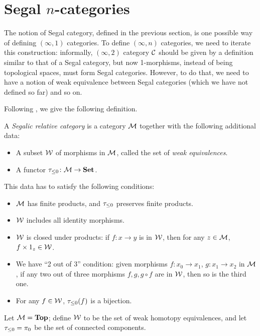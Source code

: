 \section{Segal $n$-categories}\label{s:segal-ncat}

The notion of Segal category, defined in the previous section, is one possible
way of defining $(\infty, 1)$ categories. To define $(\infty,n)$ categories, we
need to iterate this construction: informally, $(\infty, 2)$ category $\mathcal{C}$
should be given by a definition similar to that of a Segal category, but now
1-morphisms, instead of being topological spaces, must form Segal categories.
However, to do that, we need to have a notion of weak equivalence between Segal
categories (which we have not defined so far) and so on.


Following \cite{schommer-pries-category}, we give the following definition.

\begin{definition}
  A \emph{Segalic relative category} is a category $\mathcal{M}$ together with the
  following additional data:
  \begin{itemize}
    \item A subset $\mathcal{W}$ of morphisms in $\mathcal{M}$, called the set of
      \emph{weak equivalences}.
    \item A functor $\tau_{\leq 0}\colon \mathcal{M}\to \mathbf{Set}$.
  \end{itemize}
  This data has to satisfy the following conditions:
  \begin{itemize}
    \item $\mathcal{M}$ has finite products, and $\tau_{\leq 0}$ preserves finite
      products.
    \item $\mathcal{W}$ includes all identity morphisms.
    \item $\mathcal{W}$ is closed under products: if $f\colon x\to y$ is in $\mathcal{W}$,
      then for any $z\in \mathcal{M}$, $f\times 1_z\in \mathcal{W}$.
    \item We have ``2 out of 3'' condition: given morphisms $f\colon x_0\to
      x_1$, $g\colon x_1\to x_2$ in $\mathcal{M}$, if any two out of three morphisms
      $f, g, g\circ f$ are in $\mathcal{W}$, then so is the third one.
    \item For any $f\in \mathcal{W}$, $\tau_{\leq 0}(f)$ is a bijection.
  \end{itemize}
\end{definition}

\begin{example}\label{x:top-weak-equiv}
  Let $\mathcal{M}=\mathbf{Top}$; define $\mathcal{W}$ to be the set of weak homotopy equivalences,
  and let $\tau_{\leq 0}=\pi_0$ be the set of connected components.
\end{example}



